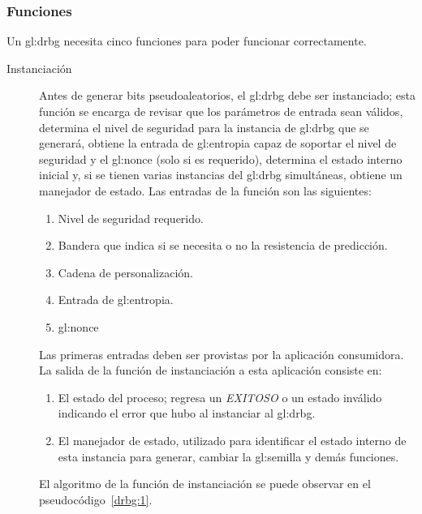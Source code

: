 %
%

\subsubsection{Funciones}

Un \gls{gl:drbg} necesita cinco funciones para poder funcionar correctamente.
\begin{description}
  \item [Instanciación] Antes de generar bits pseudoaleatorios, el \gls{gl:drbg}
    debe ser instanciado; esta función se encarga de revisar que los parámetros
    de entrada sean válidos, determina  el nivel de seguridad para la instancia
    de \gls{gl:drbg} que se generará, obtiene la entrada de \gls{gl:entropia}
    capaz de soportar el nivel de seguridad y el \gls{gl:nonce} (solo si es
    requerido), determina el estado interno inicial y, si se tienen varias
    instancias del \gls{gl:drbg} simultáneas, obtiene un manejador de estado.
    Las entradas de la función son las siguientes:
    \begin{enumerate}
      \item Nivel de seguridad requerido.
      \item Bandera que indica si se necesita o no la resistencia de predicción.
      \item Cadena de personalización.
      \item Entrada de \gls{gl:entropia}.
      \item \gls{gl:nonce}
    \end{enumerate}
    Las primeras entradas deben ser provistas por la aplicación consumidora. La
    salida de la función de instanciación a esta aplicación consiste en:
    \begin{enumerate}
      \item El estado del proceso; regresa un \textit{EXITOSO} o un estado
        inválido indicando el error que hubo al instanciar al \gls{gl:drbg}.
      \item El manejador de estado, utilizado para identificar el estado interno
        de esta instancia para generar, cambiar la \gls{gl:semilla} y demás
        funciones.
    \end{enumerate}
    El algoritmo de la función de instanciación se puede observar en el
    pseudocódigo~\ref{drbg:1}.


\end{description}
